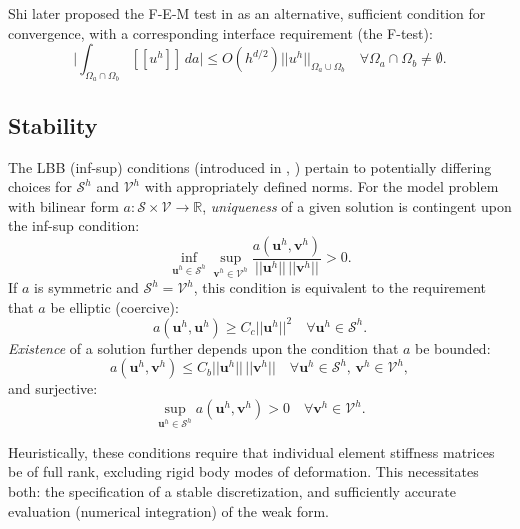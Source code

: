 	Shi later proposed the F-E-M test in \cite{Shi:87} as an alternative, sufficient condition for convergence, with a corresponding interface requirement (the F-test):
	\begin{equation}
		\bigg| \int_{\Omega_a \cap \Omega_b} [\![ u^h ]\!] \, da \bigg| \leq O(h^{d/2}) ||u^h||_{\Omega_a \cup \Omega_b} \quad \forall \Omega_a \cap \Omega_b \neq \emptyset.
	\end{equation}
	
	
\subsection*{Stability}

	The LBB (inf-sup) conditions (introduced in \cite{Babuska:71}, \cite{Brezzi:74}) pertain to potentially differing choices for $\mathcal{S}^h$ and $\mathcal{V}^h$ with appropriately defined norms. For the model problem with bilinear form $a \colon \mathcal{S} \times \mathcal{V} \rightarrow \mathbb{R}$, \textit{uniqueness} of a given solution is contingent upon the inf-sup condition:
	\begin{equation}
		\inf_{\mathbf{u}^h \in \mathcal{S}^h} \sup_{\mathbf{v}^h \in 
\mathcal{V}^h} \frac{a(\mathbf{u}^h,\mathbf{v}^h)}{||\mathbf{u}^h|| \, ||\mathbf{v}^h||} > 0.
	\end{equation}
	If $a$ is symmetric and $\mathcal{S}^h = \mathcal{V}^h$, this condition is equivalent to the requirement that $a$ be elliptic (coercive):
	\begin{equation}
		a(\mathbf{u}^h,\mathbf{u}^h) \geq C_c ||\mathbf{u}^h||^2 \quad \forall \mathbf{u}^h \in \mathcal{S}^h.
	\end{equation}
	\textit{Existence} of a solution further depends upon the condition that $a$ be bounded:
	\begin{equation}
		a(\mathbf{u}^h,\mathbf{v}^h) \leq C_b ||\mathbf{u}^h|| \, ||\mathbf{v}^h|| \quad \forall \mathbf{u}^h \in \mathcal{S}^h, \, \mathbf{v}^h \in \mathcal{V}^h,
	\end{equation}
	and surjective:
	\begin{equation}
		\sup_{\mathbf{u}^h \in 
\mathcal{S}^h} a(\mathbf{u}^h,\mathbf{v}^h) > 0 \quad \forall \mathbf{v}^h \in \mathcal{V}^h.
	\end{equation}
	
	Heuristically, these conditions require that individual element stiffness matrices be of full rank, excluding rigid body modes of deformation. This necessitates both: the specification of a stable discretization, and sufficiently accurate evaluation (numerical integration) of the weak form.
	
